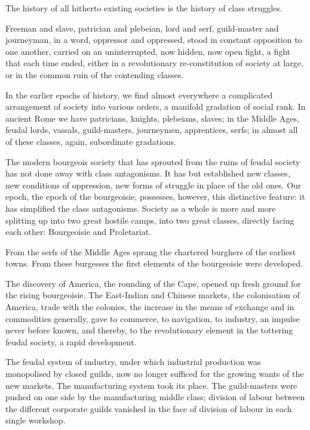 
The history of all hitherto existing societies is the history of class
struggles.

Freeman and slave, patrician and plebeian, lord and serf, guild-master
and journeyman, in a word, oppressor and oppressed, stood in constant
opposition to one another, carried on an uninterrupted, now hidden, now
open fight, a fight that each time ended, either in a revolutionary
re-constitution of society at large, or in the common ruin of the
contending classes.

In the earlier epochs of history, we find almost everywhere a
complicated arrangement of society into various orders, a manifold
gradation of social rank. In ancient Rome we have patricians, knights,
plebeians, slaves; in the Middle Ages, feudal lords, vassals,
guild-masters, journeymen, apprentices, serfs; in almost all of these
classes, again, subordinate gradations.

The modern bourgeois society that has sprouted from the ruins of feudal
society has not done away with class antagonisms. It has but
established new classes, new conditions of oppression, new forms of
struggle in place of the old ones. Our epoch, the epoch of the
bourgeoisie, possesses, however, this distinctive feature: it has
simplified the class antagonisms. Society as a whole is more and more
splitting up into two great hostile camps, into two great classes,
directly facing each other: Bourgeoisie and Proletariat.

From the serfs of the Middle Ages sprang the chartered burghers of the
earliest towns. From these burgesses the first elements of the
bourgeoisie were developed.

The discovery of America, the rounding of the Cape, opened up fresh
ground for the rising bourgeoisie. The East-Indian and Chinese markets,
the colonisation of America, trade with the colonies, the increase in
the means of exchange and in commodities generally, gave to commerce,
to navigation, to industry, an impulse never before known, and thereby,
to the revolutionary element in the tottering feudal society, a rapid
development.

The feudal system of industry, under which industrial production was
monopolised by closed guilds, now no longer sufficed for the growing
wants of the new markets. The manufacturing system took its place. The
guild-masters were pushed on one side by the manufacturing middle
class; division of labour between the different corporate guilds
vanished in the face of division of labour in each single workshop.

